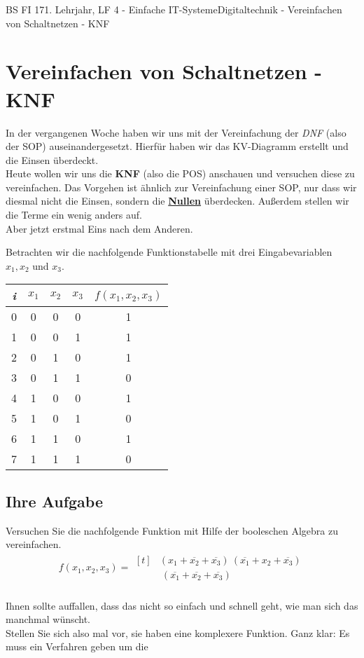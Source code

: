 \documentclass[11pt,twocolumn,oneside,openany,headings=optiontotoc,11pt,numbers=noenddot]{article}
\begin{document}
	\begin{worksheet}{BS FI 17}{1. Lehrjahr, LF 4 - Einfache IT-Systeme}{Digitaltechnik - Vereinfachen von Schaltnetzen - KNF}
		\setcounter{section}{1}
		\section{Vereinfachen von Schaltnetzen - KNF}
		In der vergangenen Woche haben wir uns mit der Vereinfachung der \textit{DNF} (also der SOP) auseinandergesetzt. Hierfür haben wir das KV-Diagramm erstellt und die Einsen überdeckt.\\
		Heute wollen wir uns die \textbf{KNF} (also die POS) anschauen und versuchen diese zu vereinfachen. Das Vorgehen ist ähnlich zur Vereinfachung einer SOP, nur dass wir diesmal nicht die Einsen, sondern die \textbf{\underline{Nullen}} überdecken. Außerdem stellen wir die Terme ein wenig anders auf.\\
		Aber jetzt erstmal Eins nach dem Anderen.\\
		\par\noindent
		Betrachten wir die nachfolgende Funktionstabelle mit drei Eingabevariablen \(x_1, x_2\) und \(x_3\).
		\begin{center}
			\begin{tabular}{|c|ccc|c|}
				\hline
				\textit{i} & \(x_1\) & \(x_2\) & \(x_3\) & \(f(x_1,x_2,x_3)\)\\
				\hline
				0 & 0 & 0 & 0 & 1\\
				\hline
				1 & 0 & 0 & 1 & 1\\
				\hline
				2 & 0 & 1 & 0 & 1\\
				\hline
				3 & 0 & 1 & 1 & 0\\
				\hline
				4 & 1 & 0 & 0 & 1\\
				\hline
				5 & 1 & 0 & 1 & 0\\
				\hline
				6 & 1 & 1 & 0 & 1\\
				\hline
				7 & 1 & 1 & 1 & 0\\
				\hline
			\end{tabular}
		\end{center}
		\subsection*{Ihre Aufgabe} Versuchen Sie die nachfolgende Funktion mit Hilfe der booleschen Algebra zu vereinfachen.
		\begin{align*}
			f(x_1,x_2,x_3) = 
			\!\begin{aligned}[t]
				& (x_1+ \overline{x_2} + \overline{x_3}) \  (\overline{x_1} + x_2 + \overline{x_3}) \\
				& \  (\overline{x_1} + \overline{x_2} + \overline{x_3})
			\end{aligned}
		\end{align*}\\
		Ihnen sollte auffallen, dass das nicht so einfach und schnell geht, wie man sich das manchmal wünscht.\\
		Stellen Sie sich also mal vor, sie haben eine komplexere Funktion. Ganz klar: Es muss ein Verfahren geben um die 
		

\end{worksheet}
\end{document}
